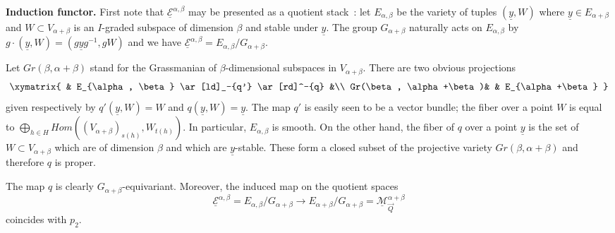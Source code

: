 \documentclass[a4paper,10pt]{amsart}
\def\a{\alpha}
\numberwithin{equation}{section}
\begin{document}
\noindent \textbf{ Induction functor.} First note that $\underline{\mathcal{E}}^{\alpha, \beta}$ may be presented as a quotient stack~:
let $E_{\alpha,\beta}$ be the variety of tuples $(\underline{y},W)$ where $\underline{y} \in E_{\alpha+\beta}$ and $W \subset V_{\alpha+\beta}$ is an $I$-graded subspace of dimension $\beta$ and stable under $\underline{y}$. The group $G_{\alpha+\beta}$ naturally acts on $E_{\alpha,\beta}$ by
$g \cdot (\underline{y},W)=(g \underline{y} g^{-1}, gW)$
and we have $\underline{\mathcal{E}}^{\alpha, \beta}=E_{\alpha,\beta}/G_{\alpha+\beta}$.

\vspace{.1in}

Let $Gr(\beta,\alpha+\beta)$ stand for the Grassmanian of $\beta$-dimensional subspaces in $V_{\alpha+\beta}$. There are two obvious projections
\begin{equation}\label{E:15}
\xymatrix{ &  E_{\alpha, \beta} \ar[ld]_-{q'} \ar[rd]^-{q} &\\
 Gr(\beta, \alpha+\beta)& &
E_{\alpha+\beta}
}
\end{equation}
given respectively by $q'(\underline{y},W)=W$ and $q(\underline{y},W)=\underline{y}$. The map $q'$ is easily seen to be a vector bundle; the fiber over a point
$W$ is equal to $\bigoplus_{h \in H} Hom((V_{\a+\beta})_{s(h)}, W_{t(h)})$. In particular, $E_{\alpha,\beta}$ is smooth. On the other hand, the fiber of $q$ over a point $\underline{y}$ is the set of $W \subset V_{\alpha+\beta}$ which are of dimension $\beta$ and which are $\underline{y}$-stable. These form a closed subset of the projective variety $Gr(\beta,\alpha+\beta)$ and therefore $q$ is proper. 

The map $q$ is clearly $G_{\alpha+\beta}$-equivariant. Moreover, the induced map on the quotient spaces $$\underline{\mathcal{E}}^{\alpha, \beta} = E_{\alpha,\beta}/G_{\alpha+\beta} \to E_{\alpha+\beta}/G_{\alpha+\beta}=\underline{\mathcal{M}}^{\alpha+\beta}_{\vec{Q}}$$
coincides with $p_2$. 

\vspace{.1in}
\end{document}
